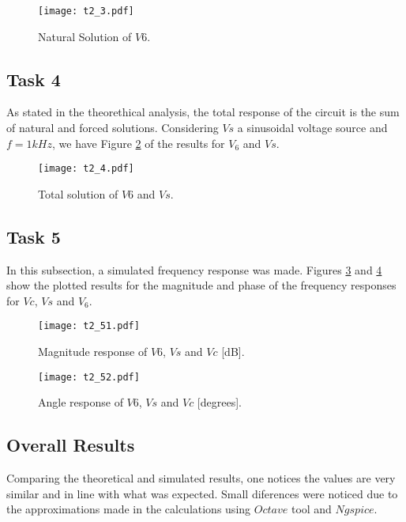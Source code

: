 \begin{figure}[h] \centering
\texttt{[image: t2\_3.pdf]}
\caption{Natural Solution of $V6$.}
\label{fig:sr_3}
\end{figure}

\newpage

\subsection{Task 4}
As stated in the theorethical analysis, the total response of the circuit is the sum of natural and forced solutions. Considering $Vs$ a sinusoidal voltage source and $f = 1kHz$, we have Figure \ref{fig:sr_4} 
of the results for $V_{6}$ and $Vs$.


\begin{figure}[h] \centering
\texttt{[image: t2\_4.pdf]}
\caption{Total solution of $V6$ and $Vs$.}
\label{fig:sr_4}
\end{figure}

\newpage

\subsection{Task 5}
In this subsection, a simulated frequency response was made. Figures \ref{fig:sr_5_1} and \ref{fig:sr_5_2} 
show the plotted results for the magnitude and phase of the frequency responses for $Vc$, $Vs$ and $V_{6}$.


\begin{figure}[h] \centering
\texttt{[image: t2\_51.pdf]}
\caption{Magnitude response of $V6$, $Vs$ and $Vc$ [dB].}
\label{fig:sr_5_1}
\end{figure}


\begin{figure}[h] \centering
\texttt{[image: t2\_52.pdf]}
\caption{Angle response of $V6$, $Vs$ and $Vc$ [degrees].}
\label{fig:sr_5_2}
\end{figure}

\subsection{Overall Results}

Comparing the theoretical and simulated results, one notices the values are very similar and in line with what was expected. Small diferences were noticed due to the approximations made in the calculations using $Octave$ tool and $Ngspice$.

